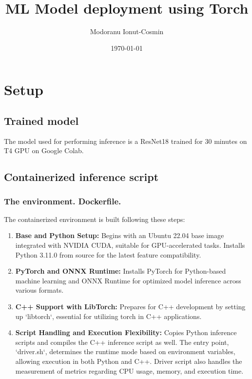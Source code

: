 \documentclass{article}
\begin{document}
\title{ML Model deployment using Torch}
\author{Modoranu Ionut-Cosmin}
\date{\today}
\maketitle



\section{Setup}
\subsection{Trained model}

The model used for performing inference is a ResNet18 trained for 30 minutes on T4 GPU on  Google Colab.

\subsection{Containerized inference script}
\subsubsection{The environment. Dockerfile.}

The containerized environment is built following these steps:
\begin{enumerate}
    \item \textbf{Base and Python Setup:} Begins with an Ubuntu 22.04 base image integrated with NVIDIA CUDA, suitable for GPU-accelerated tasks. Installs Python 3.11.0 from source for the latest feature compatibility.
    \item \textbf{PyTorch and ONNX Runtime:} Installs PyTorch for Python-based machine learning and ONNX Runtime for optimized model inference across various formats.
    \item \textbf{C++ Support with LibTorch:} Prepares for C++ development by setting up `libtorch`, essential for utilizing torch in C++ applications.
    \item \textbf{Script Handling and Execution Flexibility:} Copies Python inference scripts and compiles the C++ inference script as well. The entry point, `driver.sh`, determines the runtime mode based on environment variables, allowing execution in both Python and C++. Driver script also handles the measurement of metrics regarding CPU usage, memory, and execution time.
\end{enumerate}
\end{document}
